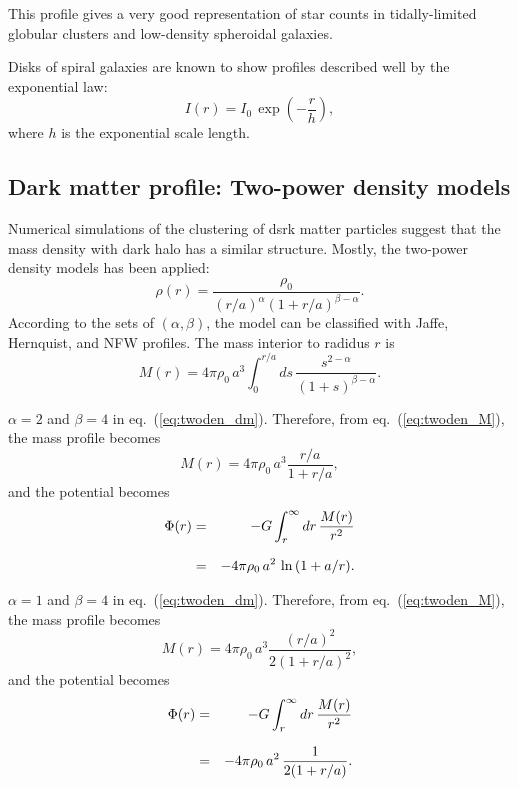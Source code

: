 This profile gives a very good representation of star counts in tidally-limited globular clusters and low-density
spheroidal galaxies.

\medskip
{}

Disks of spiral galaxies are known to show profiles described well by the exponential law:
\begin{equation}
    I(r) = I_{0}\,\exp{\left( -\frac{r}{h} \right)},
\end{equation}
where $h$ is the exponential scale length.

\bigskip
\subsection{Dark matter profile: Two-power density models \cite{Binney:87}}

Numerical simulations of the clustering of dsrk matter particles suggest that the mass density with dark halo 
has a similar structure. Mostly, the two-power density models has been applied:
\begin{equation}\label{eq:twoden_dm}
    \rho(r) = \frac{\rho_{0}}{(r/a)^{\alpha}(1+r/a)^{\beta-\alpha}}.
\end{equation}
According to the sets of $(\alpha,\beta)$, the model can be classified with Jaffe, Hernquist, and NFW profiles. 
The mass interior to radidus $r$ is
\begin{equation}\label{eq:twoden_M}
    M(r) = 4\pi\rho_{0}\,a^{3} \int^{r/a}_{0} ds\,\frac{s^{2-\alpha}}{(1+s)^{\beta-\alpha}}.
\end{equation}

\medskip
{}

$\alpha=2$ and $\beta=4$ in eq.~(\ref{eq:twoden_dm}).
Therefore, from eq.~(\ref{eq:twoden_M}), the mass profile becomes
\begin{equation}
    M(r) = 4\pi\rho_{0}\,a^{3} \frac{r/a}{1+r/a},
\end{equation}
and the potential becomes
\begin{eqnarray}
    \Phi(r) &=& -G\int^{\infty}_{r} dr\,\frac{M(r)}{r^{2}} \nonumnext
            &=& -4\pi\rho_{0}\,a^{2}\, \ln{(1+a/r)}.
\end{eqnarray}


$\alpha=1$ and $\beta=4$ in eq.~(\ref{eq:twoden_dm}).
Therefore, from eq.~(\ref{eq:twoden_M}), the mass profile becomes
\begin{equation}
    M(r) = 4\pi\rho_{0}\,a^{3} \frac{(r/a)^{2}}{2(1+r/a)^{2}},
\end{equation}
and the potential becomes
\begin{eqnarray}
    \Phi(r) &=& -G\int^{\infty}_{r} dr\,\frac{M(r)}{r^{2}} \nonumnext
            &=& -4\pi\rho_{0}\,a^{2}\, \frac{1}{2(1+r/a)}.
\end{eqnarray}


